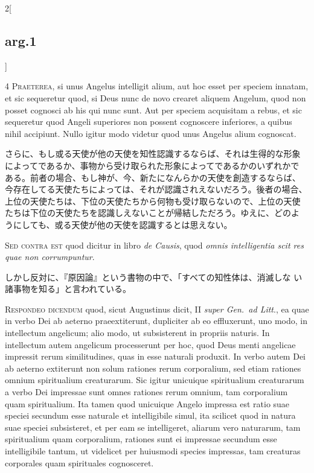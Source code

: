 \documentclass[paper=a4paper,fontsize=10pt,jafontsize=9pt,titlepage]{jlreq}
\begin{document}
\begin{paracol}{2}[\subsection{arg.1}]

{\scshape 4 Praeterea}, si unus Angelus intelligit alium, aut hoc
esset per speciem innatam, et sic sequeretur quod, si Deus nunc de
novo crearet aliquem Angelum, quod non posset cognosci ab his qui nunc
sunt. Aut per speciem acquisitam a rebus, et sic sequeretur quod
Angeli superiores non possent cognoscere inferiores, a quibus nihil
accipiunt. Nullo igitur modo videtur quod unus Angelus alium
cognoscat.

\switchcolumn

さらに、もし或る天使が他の天使を知性認識するならば、それは生得的な形象
によってであるか、事物から受け取られた形象によってであるかのいずれかで
ある。前者の場合、もし神が、今、新たになんらかの天使を創造するならば、
今存在してる天使たちによっては、それが認識されえないだろう。後者の場合、
上位の天使たちは、下位の天使たちから何物も受け取らないので、上位の天使
たちは下位の天使たちを認識しえないことが帰結しただろう。ゆえに、どのよ
うにしても、或る天使が他の天使を認識するとは思えない。

\switchcolumn*[\subsection{s.c.}]

{\scshape Sed contra est} quod dicitur in libro {\itshape de Causis},
quod {\itshape omnis intelligentia scit res quae non corrumpuntur}.

\switchcolumn

しかし反対に、『原因論』という書物の中で、「すべての知性体は、消滅しな
い諸事物を知る」と言われている。


{\scshape Respondeo dicendum} quod, sicut Augustinus dicit, II
{\itshape super Gen.~ad Litt}., ea quae in verbo Dei ab aeterno
praeextiterunt, dupliciter ab eo effluxerunt, uno modo, in intellectum
angelicum; alio modo, ut subsisterent in propriis naturis. In
intellectum autem angelicum processerunt per hoc, quod Deus menti
angelicae impressit rerum similitudines, quas in esse naturali
produxit. In verbo autem Dei ab aeterno extiterunt non solum rationes
rerum corporalium, sed etiam rationes omnium spiritualium
creaturarum. Sic igitur unicuique spiritualium creaturarum a verbo Dei
impressae sunt omnes rationes rerum omnium, tam corporalium quam
spiritualium. Ita tamen quod unicuique Angelo impressa est ratio suae
speciei secundum esse naturale et intelligibile simul, ita scilicet
quod in natura suae speciei subsisteret, et per eam se intelligeret,
aliarum vero naturarum, tam spiritualium quam corporalium, rationes
sunt ei impressae secundum esse intelligibile tantum, ut videlicet per
huiusmodi species impressas, tam creaturas corporales quam spirituales
cognosceret.


\end{paracol}
\end{document}

